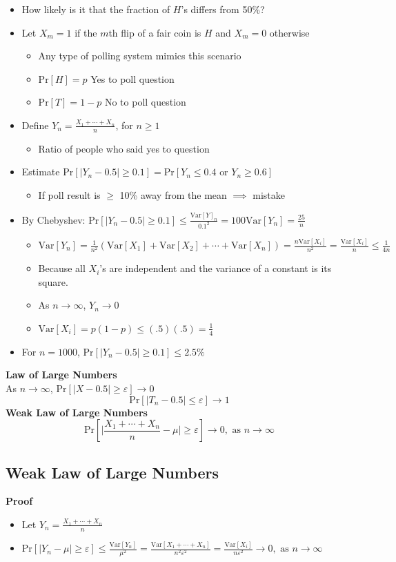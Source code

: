 \documentclass{article}\usepackage{amsmath,amssymb,amsthm,tikz,tkz-graph,color,chngpage,soul,hyperref,csquotes,graphicx,floatrow,listings, mathrsfs,framed,scrextend}\newcommand*{\QEDB}{\hfill\ensuremath{\square}}\newtheorem*{prop}{Proposition}\renewcommand{\theenumi}{\alph{enumi}}\usepackage[shortlabels]{enumitem}\usepackage[nobreak=true]{mdframed}\usetikzlibrary{matrix,calc}\MakeOuterQuote{"}\usepackage[margin=0.75in]{geometry} \newtheorem{theorem}{Theorem}
\newcommand{\x}[1]{\textrm{#1}}
\newcommand{\pr}[1]{\textrm{Pr}[#1]}
\newcommand{\xs}[1]{\textrm{ #1 }}
\newcommand{\eq}[1]{\begin{equation}#1\end{equation}}
\newcommand{\eqs}[1]{\begin{mdframed}#1\end{mdframed}}
\providecommand{\abs}[1]{\lvert#1\rvert} \providecommand{\norm}[1]{\lVert#1\rVert}
\newcommand{\items}[1]{\begin{itemize}#1\end{itemize}}
\newcommand{\var}[1]{\x{Var}[#1]}
\newcommand{\e}{\varepsilon}
\newcommand{\ninfty}{n\rightarrow\infty}
\begin{document}
\items{
    \item How likely is it that the fraction of $H$'s differs from 50\%?
    \item Let $X_m=1$ if the $m$th flip of a fair coin is $H$ and $X_m=0$ otherwise
    \items{
        \item Any type of polling system mimics this scenario
        \item $\pr{H}=p$ Yes to poll question
        \item $\pr{T}=1-p$ No to poll question
    }
    \item Define $Y_n=\frac{X_1+\cdots+X_n}{n}$, for $n\ge1$
    \items{
        \item Ratio of people who said yes to question
    }
    \item Estimate $\pr{\abs{Y_n-0.5}\ge0.1}=\pr{Y_n\le0.4\xs{or}Y_n\ge0.6}$
    \items{
        \item If poll result is $\ge$ 10\% away from the mean $\implies$ mistake
    }
     \item By Chebyshev: $\pr{\abs{Y_n-0.5}\ge 0.1}\le\frac{\var Y_n}{0.1^2}=100\var{Y_n}=\frac{25}{n}$
    \items{
        \item $\var{Y_n}=\frac{1}{n^2}(\var{X_1}+\var{X_2}+\cdots+\var{X_n})=\frac{n\var{X_i}}{n^2}=\frac{\var{X_i}}{n}\le\frac{1}{4n}$
        \item Because all $X_i$'s are independent and the variance of a constant is its square.
        \item As $\ninfty$, $Y_n\rightarrow0$
        \item $\var{X_i}=p(1-p)\le(.5)(.5)=\frac{1}{4}$
    }
    \item For $n=1000$, $\pr{\abs{Y_n-0.5}\ge 0.1}\le2.5\%$
}
\eqs{
\textbf{Law of Large Numbers}\\
As $\ninfty$, $\pr{\abs{X-0.5}\ge \e}\rightarrow 0$\\
\eq{\pr{\abs{T_n-0.5}\le\e}\rightarrow 1}
\textbf{Weak Law of Large Numbers}
\eq{\pr{\abs{\frac{X_1+\cdots+X_n}{n}-\mu}\ge\e}\rightarrow 0,\xs{as}\ninfty}
}
\subsection*{Weak Law of Large Numbers}
\textbf{Proof}
\items{
    \item Let $Y_n=\frac{X_1+\cdots+X_n}{n}$
    \item $\pr{\abs{Y_n-\mu}\ge\e}\le\frac{\var{Y_n}}{\mu^2}=\frac{\var{X_1+\cdots+X_n}}{n^2\e^2}=\frac{\var{X_i}}{n\e^2}\rightarrow0,\xs{as}\ninfty$
}
\end{document}

